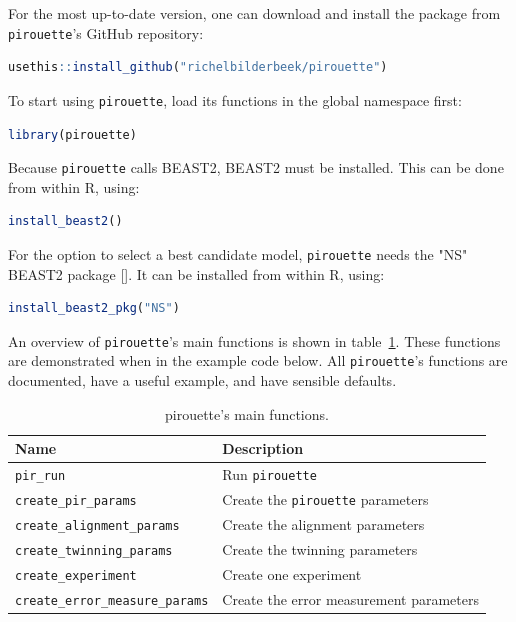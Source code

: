 \documentclass{article}
\begin{document}
For the most up-to-date version, 
one can download and install the package from \verb;pirouette;'s GitHub repository:

\begin{lstlisting}[language=R, floatplacement=ht, frame=single]
usethis::install_github("richelbilderbeek/pirouette")
\end{lstlisting}

To start using \verb;pirouette;, load its functions in the global namespace first:

\begin{lstlisting}[language=R, floatplacement=ht, frame=single]
library(pirouette)
\end{lstlisting}
Because \verb;pirouette; calls BEAST2, BEAST2 must be installed. 
This can be done from within R, using:

\begin{lstlisting}[language=R, floatplacement=ht, frame=single]
install_beast2()
\end{lstlisting}
For the option to select a best candidate model,
\verb;pirouette; needs the "NS" BEAST2 package [\cite{maturana2018model}].
It can be installed from within R, using:

\begin{lstlisting}[language=R, floatplacement=ht, frame=single]
install_beast2_pkg("NS")
\end{lstlisting}

An overview of \verb;pirouette;'s main functions is shown in 
table~\ref{tab:functions}. 
These functions are demonstrated when in the example code below.
All \verb;pirouette;'s functions are documented,
have a useful example, and have sensible defaults.

\begin{table}[h]
\centering
\begin{tabular}{ | l | l | }
\hline
\textbf{Name} & \textbf{Description} \\
\hline
\verb;pir_run; & Run \verb;pirouette; \\
\verb;create_pir_params; & Create the \verb;pirouette; parameters \\
\hline
\verb;create_alignment_params; & Create the alignment parameters \\
\verb;create_twinning_params; & Create the twinning parameters \\
\verb;create_experiment; & Create one experiment \\
\verb;create_error_measure_params; & Create the error measurement parameters \\
\hline
\end{tabular}
\caption{pirouette's main functions.}
\label{tab:functions}
\end{table}
\end{document}
